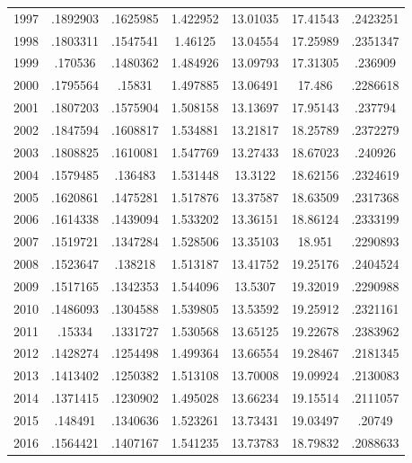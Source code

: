 {\begin{longtable}{l*{1}{cccccc}}
1997        &    .1892903&    .1625985&    1.422952&    13.01035&    17.41543&    .2423251\\
1998        &    .1803311&    .1547541&     1.46125&    13.04554&    17.25989&    .2351347\\
1999        &     .170536&    .1480362&    1.484926&    13.09793&    17.31305&     .236909\\
2000        &    .1795564&      .15831&    1.497885&    13.06491&      17.486&    .2286618\\
2001        &    .1807203&    .1575904&    1.508158&    13.13697&    17.95143&     .237794\\
2002        &    .1847594&    .1608817&    1.534881&    13.21817&    18.25789&    .2372279\\
2003        &    .1808825&    .1610081&    1.547769&    13.27433&    18.67023&     .240926\\
2004        &    .1579485&     .136483&    1.531448&     13.3122&    18.62156&    .2324619\\
2005        &    .1620861&    .1475281&    1.517876&    13.37587&    18.63509&    .2317368\\
2006        &    .1614338&    .1439094&    1.533202&    13.36151&    18.86124&    .2333199\\
2007        &    .1519721&    .1347284&    1.528506&    13.35103&      18.951&    .2290893\\
2008        &    .1523647&     .138218&    1.513187&    13.41752&    19.25176&    .2404524\\
2009        &    .1517165&    .1342353&    1.544096&     13.5307&    19.32019&    .2290988\\
2010        &    .1486093&    .1304588&    1.539805&    13.53592&    19.25912&    .2321161\\
2011        &      .15334&    .1331727&    1.530568&    13.65125&    19.22678&    .2383962\\
2012        &    .1428274&    .1254498&    1.499364&    13.66554&    19.28467&    .2181345\\
2013        &    .1413402&    .1250382&    1.513108&    13.70008&    19.09924&    .2130083\\
2014        &    .1371415&    .1230902&    1.495028&    13.66234&    19.15514&    .2111057\\
2015        &     .148491&    .1340636&    1.523261&    13.73431&    19.03497&      .20749\\
2016        &    .1564421&    .1407167&    1.541235&    13.73783&    18.79832&    .2088633\\

\end{longtable}}
